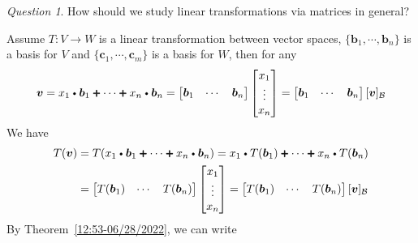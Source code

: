\documentclass{beamer}
\newcommand{\fatdot}{\mathrel{\raisebox{0.25ex}{\tikz\filldraw[black,x=2pt,y=2pt] (0,0) circle (0.5);}}}
\newcommand{\fatplus}{\mathrel{\raisebox{-0.1ex}{\tikz\filldraw[black,x=2pt,y=2pt,scale=1.4] (0.9,0)--(1.1,0)--(1.1,0.9)--(2,0.9)--(2,1.1)--(1.1,1.1)--(1.1,2)--(0.9,2)--(0.9,1.1)--(0,1.1)--(0,0.9)--(0.9,0.9)--cycle;}}}
\theoremstyle{definition}
\theoremstyle{remark}
\newtheorem*{question}{Question}
\begin{document}
\begin{frame}[t]
\begin{question}
How should we study linear transformations via matrices in general?
\end{question}
\pause
Assume $T:V\to W$ is a linear transformation between vector spaces, $\{\bm b_1,\cdots,\bm b_n\}$ is a basis for $V$ and $\{\bm c_1,\cdots,\bm c_m\}$ is a basis for $W$\pause, then for any
\begin{align*}
\bm v=x_1\fatdot\bm b_1\fatplus\cdots\fatplus x_n\fatdot\bm b_n=\begin{bmatrix}
\bm b_1&\cdots&\bm b_n
\end{bmatrix}\begin{bmatrix}
x_1\\\vdots\\x_n
\end{bmatrix}=\begin{bmatrix}
\bm b_1&\cdots&\bm b_n
\end{bmatrix}[\bm v]_{\mathcal B}
\end{align*}\pause
We have
\begin{align*}
T(\bm v)&=T(x_1\fatdot\bm b_1\fatplus\cdots\fatplus x_n\fatdot\bm b_n)=x_1\fatdot T(\bm b_1)\fatplus\cdots\fatplus x_n\fatdot T(\bm b_n)\\
&=\begin{bmatrix}
T(\bm b_1)&\cdots&T(\bm b_n)
\end{bmatrix}\begin{bmatrix}
x_1\\\vdots\\x_n
\end{bmatrix}=\begin{bmatrix}
T(\bm b_1)&\cdots&T(\bm b_n)
\end{bmatrix}[\bm v]_{\mathcal B}
\end{align*}\pause
By Theorem~\ref{12:53-06/28/2022}, we can write
\end{frame}
\end{document}
